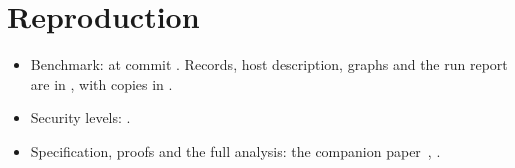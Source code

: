 \documentclass[11pt,a4paper]{article}
\begin{document}
\section{Reproduction}\label{sec:repro}

\begin{itemize}
\item Benchmark: 
  at  commit \texttt{\EigenxCommit}. Records, host description,
  graphs and the run report are in
  , with copies in
  .
\item Security levels: .
\item Specification, proofs and the full analysis: the companion
  paper~\cite{EigenSetaPaper}, .
\end{itemize}




\end{document}

